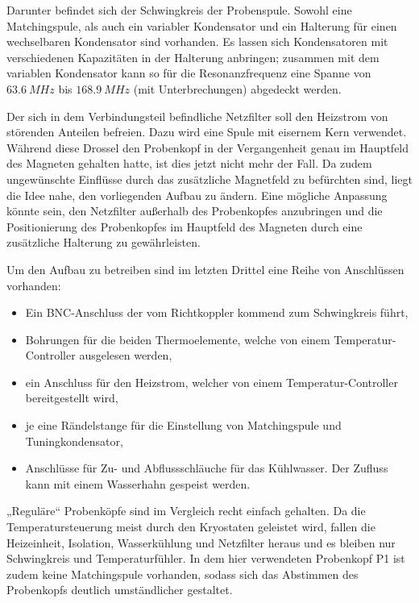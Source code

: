 Darunter befindet sich der Schwingkreis der Probenspule. Sowohl eine Matchingspule, als auch ein variabler Kondensator und ein Halterung für einen wechselbaren Kondensator sind vorhanden. Es lassen sich Kondensatoren mit verschiedenen Kapazitäten in der Halterung anbringen; zusammen mit dem variablen Kondensator kann so für die Resonanzfrequenz eine Spanne von $\SI{63,6}{MHz}$ bis $\SI{168,9}{MHz}$ (mit Unterbrechungen) abgedeckt werden.


Der sich in dem Verbindungsteil befindliche Netzfilter soll den Heizstrom von störenden Anteilen befreien. Dazu wird eine Spule mit eisernem Kern verwendet. Während diese Drossel den Probenkopf in der Vergangenheit genau im Hauptfeld des Magneten gehalten hatte, ist dies jetzt nicht mehr der Fall. Da zudem ungewünschte Einflüsse durch das zusätzliche Magnetfeld zu befürchten sind, liegt die Idee nahe, den vorliegenden Aufbau zu ändern. Eine mögliche Anpassung könnte sein, den Netzfilter außerhalb des Probenkopfes anzubringen und die Positionierung des Probenkopfes im Hauptfeld des Magneten durch eine zusätzliche Halterung zu gewährleisten.

Um den Aufbau zu betreiben sind im letzten Drittel eine Reihe von Anschlüssen vorhanden:
\begin{itemize}
	\item Ein BNC-Anschluss der vom Richtkoppler kommend zum Schwingkreis führt,
	\item Bohrungen für die beiden Thermoelemente, welche von einem Temperatur-Controller ausgelesen werden,
	\item ein Anschluss für den Heizstrom, welcher von einem Temperatur-Controller bereitgestellt wird,
	\item je eine Rändelstange für die Einstellung von Matchingspule und Tuningkondensator,
	\item Anschlüsse für Zu- und Abflussschläuche für das Kühlwasser. Der Zufluss kann mit einem Wasserhahn gespeist werden.
\end{itemize}

„Reguläre“ Probenköpfe sind im Vergleich recht einfach gehalten. Da die Temperatursteuerung meist durch den Kryostaten geleistet wird, fallen die Heizeinheit, Isolation, Wasserkühlung und Netzfilter heraus und es bleiben nur Schwingkreis und Temperaturfühler. In dem hier verwendeten Probenkopf P1 ist zudem keine Matchingspule vorhanden, sodass sich das Abstimmen des Probenkopfs deutlich umständlicher gestaltet.




